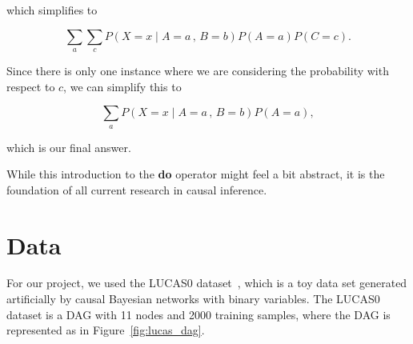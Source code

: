 \documentclass{article}
\begin{document}
which simplifies to

\begin{equation*}
    \sum_{a}\sum_{c}P(X=x\;|\; A=a\,,\, B=b)P(A=a)P(C=c).
\end{equation*}

Since there is only one instance where we are considering the probability with respect to $c$, 
we can simplify this to

\begin{equation*}
    \sum_{a}P(X=x\;|\; A=a\,,\, B=b)P(A=a),
\end{equation*}

which is our final answer.

While this introduction to the \textbf{do} operator might feel a bit abstract, it is the foundation
of all current research in causal inference. 





\section{Data}
\label{data}

For our project, we used the LUCAS0 dataset~\cite{lucas_dataset}, which is a toy data set 
generated artificially by causal Bayesian networks with binary variables. The LUCAS0 dataset
is a DAG with 11 nodes and 2000 training samples, where the DAG is represented as in Figure~\ref{fig:lucas_dag}.
\end{document}
